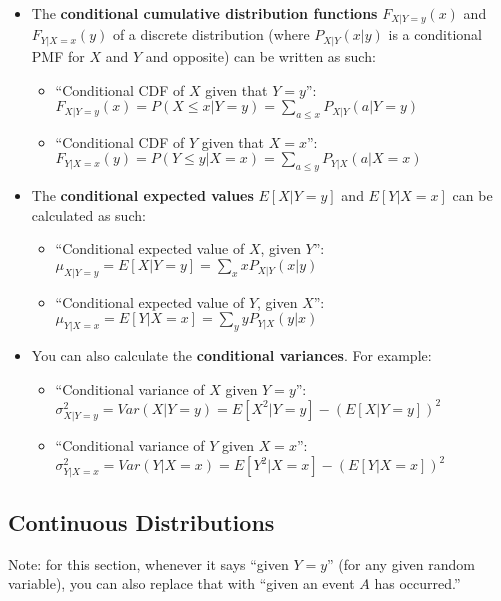 \documentclass[12pt]{article}
\begin{document}
\begin{itemize}
\begin{enumerate}
\begin{itemize}
		            \end{itemize}
	      \end{enumerate}
	\item The \textbf{conditional cumulative distribution functions} $F_{X|Y=y}
		      (x)$ and $F_{Y|X=x} (y)$ of a discrete distribution (where
	      $P_{X|Y}(x|y)$ is a conditional PMF for $X$ and $Y$ and opposite)
	      can be written as
	      such:
	      \begin{itemize}
		      \item ``Conditional CDF of $X$ given that $Y=y$'': $F_{X|Y=y} (x) = P(X \leq x | Y = y) = \displaystyle\sum_{a \leq x} P_{X|Y}(a | Y = y)$
		      \item ``Conditional CDF of $Y$ given that $X=x$'': $F_{Y|X=x} (y) = P(Y \leq y | X = x) = \displaystyle\sum_{a \leq y} P_{Y|X}(a | X = x)$
	      \end{itemize}
	\item The \textbf{conditional expected values} $E[X|Y = y]$ and $E[Y |X = x]$ can be calculated as such:
	      \begin{itemize}
		      \item ``Conditional expected value of $X$, given $Y$'': $\mu_{X|Y=y} = E[X | Y=y] = \displaystyle\sum_{x} x P_{X|Y}(x|y)$
		      \item ``Conditional expected value of $Y$, given $X$'': $\mu_{Y|X=x} = E[Y | X=x] = \displaystyle\sum_{y} y P_{Y|X}(y|x)$
	      \end{itemize}
	\item You can also calculate the \textbf{conditional variances}. For example:
	      \begin{itemize}
		      \item ``Conditional variance of $X$ given $Y=y$'': $\sigma_{X|Y=y}^2 = Var(X|Y=y) = E[X^2 | Y=y] - (E[X|Y=y])^2$
		      \item ``Conditional variance of $Y$ given $X=x$'': $\sigma_{Y|X=x}^2 = Var(Y|X=x) = E[Y^2 | X=x] - (E[Y|X=x])^2$
	      \end{itemize}
\end{itemize}

\subsection{Continuous Distributions} %
Note: for this section, whenever it says ``given $Y=y$'' (for any given random variable), you can also replace that with ``given an event $A$ has occurred.''
\end{document}
